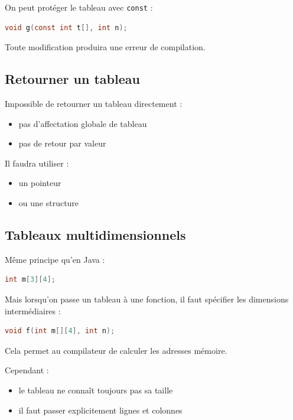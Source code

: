 On peut protéger le tableau avec \texttt{const} :

\begin{lstlisting}[language=C]
void g(const int t[], int n);
\end{lstlisting}

Toute modification produira une erreur de compilation.

\subsection{Retourner un tableau}

Impossible de retourner un tableau directement :

\begin{itemize}
    \item pas d’affectation globale de tableau
    \item pas de retour par valeur
\end{itemize}

Il faudra utiliser :

\begin{itemize}
    \item un pointeur
    \item ou une structure
\end{itemize}

\subsection{Tableaux multidimensionnels}

Même principe qu’en Java :

\begin{lstlisting}[language=C]
int m[3][4];
\end{lstlisting}

Mais lorsqu’on passe un tableau à une fonction,
il faut spécifier les dimensions intermédiaires :

\begin{lstlisting}[language=C]
void f(int m[][4], int n);
\end{lstlisting}

Cela permet au compilateur de calculer les adresses mémoire.

Cependant :

\begin{itemize}
    \item le tableau ne connaît toujours pas sa taille
    \item il faut passer explicitement lignes et colonnes
\end{itemize}

